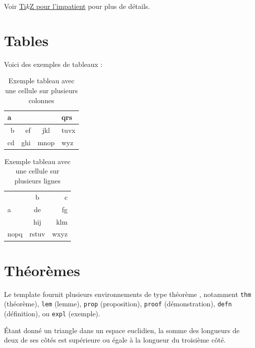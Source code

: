 \documentclass[a4paper, 12pt]{report}
\begin{document}
    Voir \href{http://math.et.info.free.fr/TikZ/}{Ti$k$Z pour l'impatient} pour plus de détails.

    \section{Tables}

    Voici des exemples de tableaux :

    \begin{table}[H]
        \centering
        \begin{tabular}{|r|r|c|l|}
            \hline
            \multicolumn{3}{|l|}{a} & qrs  \\ \hline
             b &  ef &     jkl      & tuvx \\ \hline
            cd & ghi &     mnop     & wyz  \\ \hline
        \end{tabular}
        \caption{Exemple tableau avec une cellule sur plusieurs colonnes}
        \label{tab:multicol_example}
    \end{table}

    \begin{table}[H]
        \centering
        \begin{tabular}{|l|c|r|}
            \hline
            \multirow{3}{2cm}{a} &   b   &    c \\ \cline{2-3}
                                 &  de   &   fg \\ \cline{2-3}
                                 &  hij  &  klm \\ \hline
            nopq                 & rstuv & wxyz \\ \hline
        \end{tabular}
        \caption{Exemple tableau avec une cellule sur plusieurs lignes}
        \label{tab:multirow_example}
    \end{table}

    \section{Théorèmes}
    Le template fournit plusieurs environnements de type \og théorème \fg, notamment \verb+thm+ (théorème), \verb+lem+ (lemme), \verb+prop+ (proposition), \verb+proof+ (démonstration), \verb+defn+ (définition), ou \verb+expl+ (exemple).

    \begin{thm}
        Étant donné un triangle dans un espace euclidien, la somme des longueurs de deux de ses côtés est supérieure ou égale à la longueur du troisième côté.
    \end{thm}
\end{document}
